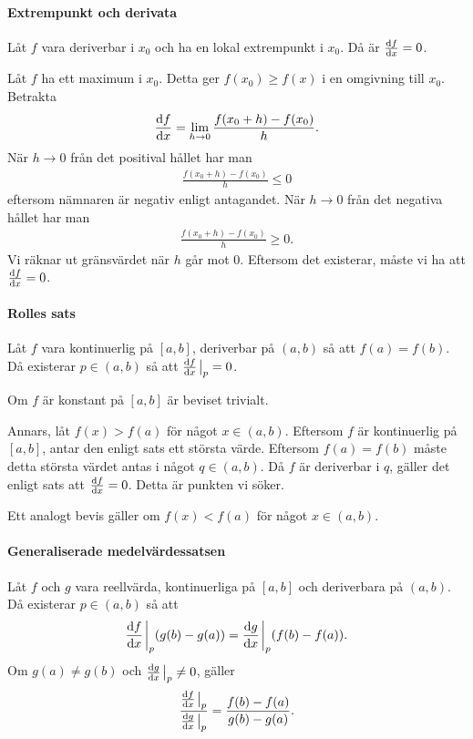 \proof

\paragraph{Extrempunkt och derivata}
Låt $f$ vara deriverbar i $x_0$ och ha en lokal extrempunkt i $x_0$. Då är $\dv{f}{x} (x_0) = 0$.

\proof
Låt $f$ ha ett maximum i $x_0$. Detta ger $f(x_0)\geq f(x)$ i en omgivning till $x_0$. Betrakta
\begin{align*}
	\dv{f}{x} (x_0) = \lim\limits_{h\to 0}\frac{f(x_0 + h) - f(x_0)}{h}.
\end{align*}
När $h\to 0$ från det positival hållet har man
\begin{align*}
	\frac{f(x_0 + h) - f(x_0)}{h}\leq 0
\end{align*}
eftersom nämnaren är negativ enligt antagandet. När $h\to 0$ från det negativa hållet har man
\begin{align*}
	\frac{f(x_0 + h) - f(x_0)}{h}\geq 0.
\end{align*}
Vi räknar ut gränsvärdet när $h$ går mot $0$. Eftersom det existerar, måste vi ha att $\dv{f}{x} (x_0) = 0$.

\paragraph{Rolles sats}
Låt $f$ vara kontinuerlig på $[a, b]$, deriverbar på $(a, b)$ så att $f(a) = f(b)$. Då existerar $p\in (a, b)$ så att $\dv{f}{x}\eval_p = 0$.

\proof
Om $f$ är konstant på $[a, b]$ är beviset trivialt.

Annars, låt $f(x) > f(a)$ för något $x\in (a, b)$. Eftersom $f$ är kontinuerlig på $[a, b]$, antar den enligt sats ett största värde. Eftersom $f(a) = f(b)$ måste detta största värdet antas i något $q\in (a, b)$. Då $f$ är deriverbar i $q$, gäller det enligt sats att $\dv{f}{x} (q) = 0$. Detta är punkten vi söker.

Ett analogt bevis gäller om $f(x) < f(a)$ för något $x\in (a, b)$.

\paragraph{Generaliserade medelvärdessatsen}
Låt $f$ och $g$ vara reellvärda, kontinuerliga på $[a, b]$ och deriverbara på $(a, b)$. Då existerar $p\in (a, b)$ så att
\begin{align*}
	\dv{f}{x}\eval_p(g(b) - g(a)) = \dv{g}{x}\eval_p(f(b) - f(a)).
\end{align*}
Om $g(a)\neq g(b)$ och $\dv{g}{x}\eval_p\neq 0$, gäller
\begin{align*}
	\frac{\dv{f}{x}\eval_p}{\dv{g}{x}\eval_p} = \frac{f(b) - f(a)}{g(b) - g(a)}.
\end{align*}

